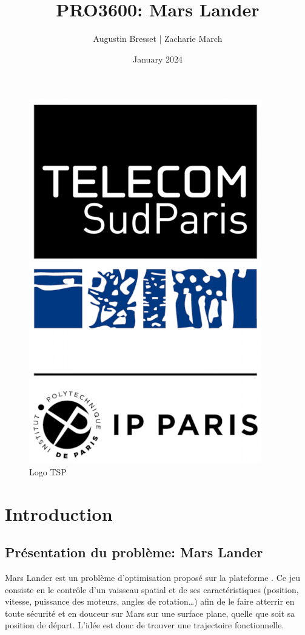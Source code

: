 \documentclass[french,a4paper,10pt,twocolumn]{article}
\title{PRO3600: Mars Lander}
\author{Augustin Bresset | Zacharie March}
\date{January 2024}
\begin{document}
\onecolumn
\maketitle

\begin{figure}[h]
    \centering
    \includegraphics[scale=0.2]{images/logo-tsp-fond-blanc.png}
    \caption{Logo TSP}\label{fig:logo}
\end{figure}

\tableofcontents
\pagebreak

\section{Introduction}

\subsection{Présentation du problème: Mars Lander}

Mars Lander est un problème d'optimisation proposé sur la plateforme \cite[]{codingame_mars_lander}.
Ce jeu consiste en le contrôle d'un vaisseau spatial et de ses caractéristiques (position, vitesse, puissance des moteurs, angles de rotation…) 
afin de le faire atterrir en toute sécurité et en douceur sur Mars sur une surface plane, quelle que soit sa position de départ. 
L'idée est donc de trouver une trajectoire fonctionnelle.
\end{document}
